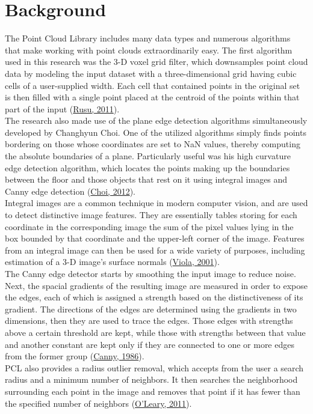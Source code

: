 \documentclass[12pt]{report}
\begin{document}
\section{Background}
The Point Cloud Library includes many data types and numerous algorithms that make working with point clouds extraordinarily easy.  The first algorithm used in this research was the 3-D voxel grid filter, which downsamples point cloud data by modeling the input dataset with a three-dimensional grid having cubic cells of a user-supplied width.  Each cell that contained points in the original set is then filled with a single point placed at the centroid of the points within that part of the input (\hyperref[bib:rusu]{Rusu, 2011}). \\
The research also made use of the plane edge detection algorithms simultaneously developed by Changhyun Choi.  One of the utilized algorithms simply finds points bordering on those whose coordinates are set to NaN values, thereby computing the absolute boundaries of a plane.  Particularly useful was his high curvature edge detection algorithm, which locates the points making up the boundaries between the floor and those objects that rest on it using integral images and Canny edge detection (\hyperref[bib:choi]{Choi, 2012}). \\
Integral images are a common technique in modern computer vision, and are used to detect distinctive image features.  They are essentially tables storing for each coordinate in the corresponding image the sum of the pixel values lying in the box bounded by that coordinate and the upper-left corner of the image.  Features from an integral image can then be used for a wide variety of purposes, including estimation of a 3-D image's surface normals (\hyperref[bib:viola]{Viola, 2001}). \\
The Canny edge detector starts by smoothing the input image to reduce noise.  Next, the spacial gradients of the resulting image are measured in order to expose the edges, each of which is assigned a strength based on the distinctiveness of its gradient.  The directions of the edges are determined using the gradients in two dimensions, then they are used to trace the edges.  Those edges with strengths above a certain threshold are kept, while those with strengths between that value and another constant are kept only if they are connected to one or more edges from the former group (\hyperref[bib:canny]{Canny, 1986}). \\
PCL also provides a radius outlier removal, which accepts from the user a search radius and a minimum number of neighbors.  It then searches the neighborhood surrounding each point in the image and removes that point if it has fewer than the specified number of neighbors (\hyperref[bib:oleary]{O'Leary, 2011}). \\
\end{document}
